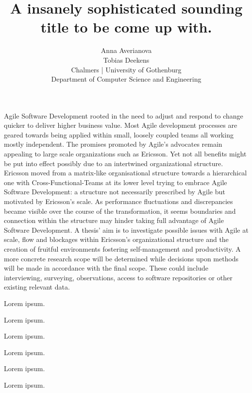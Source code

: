 \documentclass[times, 10pt,twocolumn]{article}
\begin{document}
	\title{A insanely sophisticated sounding title to be come up with.}

	\author{Anna Averianova\\
		Tobias Deekens\\
		Chalmers | University of Gothenburg\\
		Department of Computer Science and Engineering\\
	}

	\maketitle
	\thispagestyle{empty}


	Agile Software Development rooted in the need to adjust and respond to change quicker to deliver higher business value. Most Agile development processes are geared towards being applied within small, loosely coupled teams all working mostly independent. The promises promoted by Agile’s advocates remain appealing to large scale organizations such as Ericsson. Yet not all benefits might be put into effect possibly due to an intertwined organizational structure.
   Ericsson moved from a matrix-like organisational structure towards a hierarchical one with Cross-Functional-Teams at its lower level trying to embrace Agile Software Development: a structure not necessarily prescribed by Agile but motivated by Ericsson’s scale. As performance fluctuations and discrepancies became visible over the course of the transformation, it seems boundaries and connection within the structure may hinder taking full advantage of Agile Software Development.
   A thesis’ aim is to investigate possible issues with Agile at scale, flow and blockages within Ericsson’s organizational structure and the creation of fruitful environments fostering self-management and productivity. A more concrete research scope will be determined while decisions upon methods will be made in accordance with the final scope. These could include interviewing, surveying, observations, access to software repositories or other existing relevant data.


	Lorem ipsum.


	Lorem ipsum.


	Lorem ipsum.


	Lorem ipsum.


	Lorem ipsum.


	Lorem ipsum.

	
	
\end{document}

